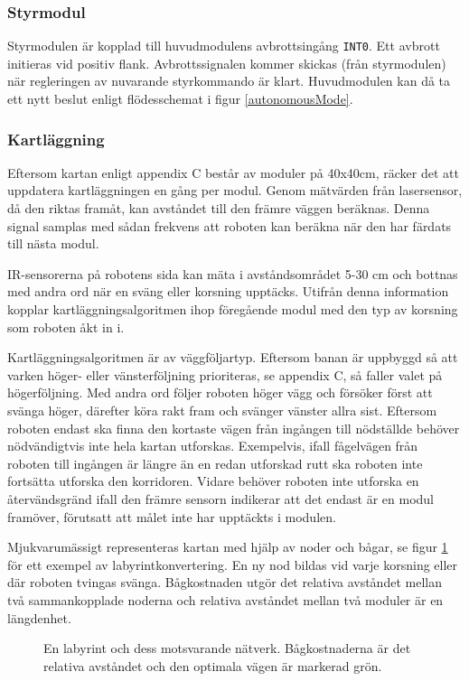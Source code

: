\documentclass[11pt]{article}
\begin{document}
\begin{flushleft}
\subsubsection{Styrmodul}
\label{styrModul}
Styrmodulen är kopplad till huvudmodulens avbrottsingång  \verb+INT0+. Ett avbrott initieras vid positiv flank. Avbrottssignalen kommer skickas (från styrmodulen) när regleringen av nuvarande styrkommando är klart. Huvudmodulen kan då ta ett nytt beslut enligt flödesschemat i figur \ref{autonomousMode}.

\subsubsection{Kartläggning}
Eftersom kartan enligt appendix C består av moduler på 40x40cm, räcker det att uppdatera kartläggningen en gång per modul. Genom mätvärden från lasersensor, då den riktas framåt, kan avståndet till den främre väggen beräknas. Denna signal samplas med sådan frekvens att roboten kan beräkna när den har färdats till nästa modul. 

IR-sensorerna på robotens sida kan mäta i avståndsområdet 5-30 cm och bottnas med andra ord när en sväng eller korsning upptäcks. Utifrån denna information kopplar kartläggningsalgoritmen ihop föregående modul med den typ av korsning som roboten åkt in i. 

Kartläggningsalgoritmen är av väggföljartyp. Eftersom banan är uppbyggd så att varken höger- eller vänsterföljning prioriteras, se appendix C, så faller valet på högerföljning. Med andra ord följer roboten höger vägg och försöker först att svänga höger, därefter köra rakt fram och svänger vänster allra sist. Eftersom roboten endast ska finna den kortaste vägen från ingången till nödställde behöver nödvändigtvis inte hela kartan utforskas. Exempelvis, ifall fågelvägen från roboten till ingången är längre än en redan utforskad rutt ska roboten inte fortsätta utforska den korridoren. Vidare behöver roboten inte utforska en återvändsgränd ifall den främre sensorn indikerar att det endast är en modul framöver, förutsatt att målet inte har upptäckts i modulen.

Mjukvarumässigt representeras kartan med hjälp av noder och bågar, se figur \ref{labToGraph} för ett exempel av labyrintkonvertering. En ny nod bildas vid varje korsning eller där roboten tvingas svänga. Bågkostnaden utgör det relativa avståndet mellan två sammankopplade noderna och relativa avståndet mellan två moduler är en längdenhet.

\begin{figure}[htbp]
\centering
\noindent\resizebox{.6\linewidth}{!}{
	}
	\caption{En labyrint och dess motsvarande nätverk. Bågkostnaderna är det relativa avståndet och den optimala vägen är markerad grön.\label{labToGraph}}	
\end{figure}


\end{flushleft}
\end{document}

